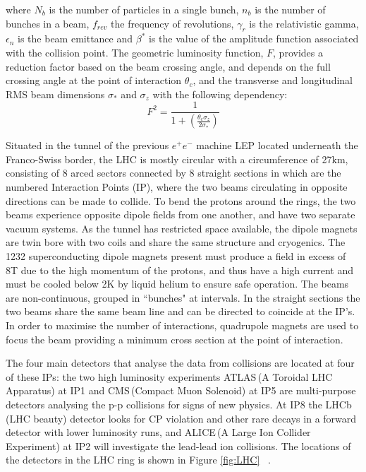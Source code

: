 where $N_{b}$ is the number of particles in a single bunch, $n_{b}$ is the number of bunches in a beam, $f_{rev}$ the frequency of revolutions, $\gamma_{r}$ is the relativistic gamma, $\epsilon_{n}$ is the beam emittance and $\beta^{*}$ is the value of the amplitude function associated with the collision point. The geometric luminosity function, $F$, provides a reduction factor based on the beam crossing angle, and depends on the full crossing angle at the point of interaction $\theta_{c}$, and the transverse and longitudinal RMS beam dimensions $\sigma_{*}$ and $\sigma_{z}$ with the following dependency:
\begin{equation}
F^{2} = \frac{1}{1+(\frac{\theta_{c} \sigma_{z}}{2\sigma_{*}})}
\label{eq:lumi2}
\end{equation}

Situated in the tunnel of the previous $e^{+}e^{-}$ machine LEP located underneath the Franco-Swiss border,  the LHC is mostly circular with a circumference of 27km, consisting of 8 arced sectors connected by 8 straight sections in which are the numbered Interaction Points (IP), where the two beams circulating in opposite directions can be made to collide. To bend the protons around the rings, the two beams experience opposite dipole fields from one another, and have two separate vacuum systems. As the tunnel has restricted space available, the dipole magnets are twin bore with two coils and share the same structure and cryogenics. The 1232 superconducting dipole magnets present must produce a field in excess of 8T due to the high momentum of the protons, and thus have a high current and must be cooled below 2K by liquid helium to ensure safe operation. The beams are non-continuous, grouped in ``bunches" at intervals. In the straight sections the two beams share the same beam line and can be directed to coincide at the IP's. In order to maximise the number of interactions, quadrupole magnets are used to focus the beam providing a minimum cross section at the point of interaction.

The four main detectors that analyse the data from collisions are located at four of these IPs: the two high luminosity experiments ATLAS\,(A Toroidal LHC Apparatus) at IP1 and CMS\,(Compact Muon Solenoid) at IP5 are multi-purpose detectors analysing the p-p collisions for signs of new physics. At IP8 the LHCb\,(LHC beauty) detector looks for CP violation and other rare decays in a forward detector with lower luminosity runs, and ALICE\,(A Large Ion Collider Experiment) at IP2 will investigate the lead-lead ion collisions. The locations of the detectors in the LHC ring is shown in Figure \ref{fig:LHC}~\cite{LHCConcept} .

